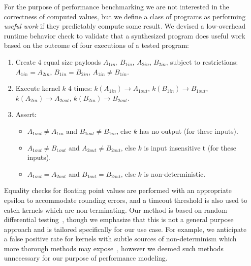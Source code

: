 For the purpose of performance benchmarking we are not interested in the correctness of computed values, but we define a class of programs as performing \emph{useful work} if they predictably compute some result. We devised a low-overhead runtime behavior check to validate that a synthesized program does useful work based on the outcome of four executions of a tested program:%
%
\begin{enumerate}
  \item Create 4 equal size payloads $A_{1in}$, $B_{1in}$, $A_{2in}$,
  $B_{2in}$, subject to restrictions: $A_{1in}=A_{2in}$,
  $B_{1in}=B_{2in}$, $A_{1in} \ne B_{1in}$.
  \item Execute kernel $k$ 4 times: $k(A_{1in}) \rightarrow A_{1out}$,
  $k(B_{1in}) \rightarrow B_{1out}$,
  $k(A_{2in}) \rightarrow A_{2out}$,
  $k(B_{2in}) \rightarrow B_{2out}$.
  \item Assert:
  \begin{itemize}
    \item $A_{1out} \ne A_{1in}$ and $B_{1out} \ne B_{1in}$, else $k$ has no
    output (for these inputs).%
    \item $A_{1out} \ne B_{1out}$ and $A_{2out} \ne B_{2out}$, else $k$ is input insensitive t (for these inputs).%
    \item $A_{1out}=A_{2out}$ and $B_{1out}=B_{2out}$, else $k$ is
    non-deterministic.
  \end{itemize}
\end{enumerate}
%
\noindent%
Equality checks for floating point values are performed with an appropriate epsilon to accommodate rounding errors, and a timeout threshold is also used to catch kernels which are non-terminating. Our method is based on random differential testing~\cite{McKeeman1998}, though we emphasize that this is not a general purpose approach and is tailored specifically for our use case. For example, we anticipate a false positive rate for kernels with subtle sources of non-determinism which more thorough methods may expose~\cite{Betts2012,Price2015,Sorensen2016}, however we deemed such methods unnecessary for our purpose of performance modeling.
